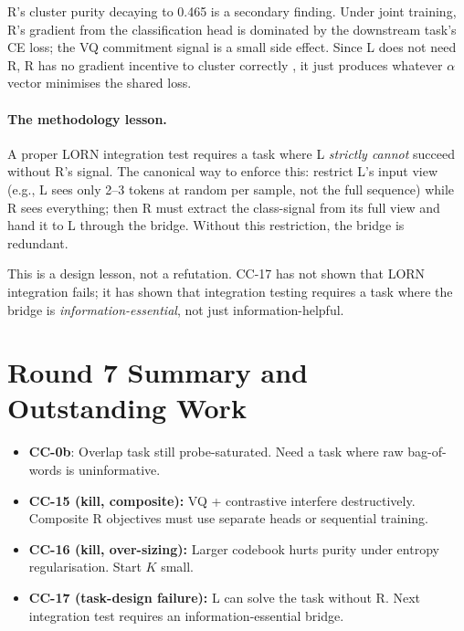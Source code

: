 \documentclass[10pt, twocolumn, a4paper]{article}
\begin{document}
R's cluster purity decaying to 0.465 is a secondary finding. Under joint training, R's gradient from the classification head is dominated by the downstream task's CE loss; the VQ commitment signal is a small side effect. Since L does not need R, R has no gradient incentive to cluster correctly ,  it just produces whatever $\alpha$ vector minimises the shared loss.

\paragraph{The methodology lesson.} A proper LORN integration test requires a task where L \emph{strictly cannot} succeed without R's signal. The canonical way to enforce this: restrict L's input view (e.g., L sees only 2--3 tokens at random per sample, not the full sequence) while R sees everything; then R must extract the class-signal from its full view and hand it to L through the bridge. Without this restriction, the bridge is redundant.

This is a design lesson, not a refutation. CC-17 has not shown that LORN integration fails; it has shown that integration testing requires a task where the bridge is \emph{information-essential}, not just information-helpful.


\section{Round 7 Summary and Outstanding Work}

\begin{itemize}[nosep]
\item \textbf{CC-0b}: Overlap task still probe-saturated. Need a task where raw bag-of-words is uninformative.
\item \textbf{CC-15 (kill, composite):} VQ + contrastive interfere destructively. Composite R objectives must use separate heads or sequential training.
\item \textbf{CC-16 (kill, over-sizing):} Larger codebook hurts purity under entropy regularisation. Start $K$ small.
\item \textbf{CC-17 (task-design failure):} L can solve the task without R. Next integration test requires an information-essential bridge.
\end{itemize}
\end{document}
